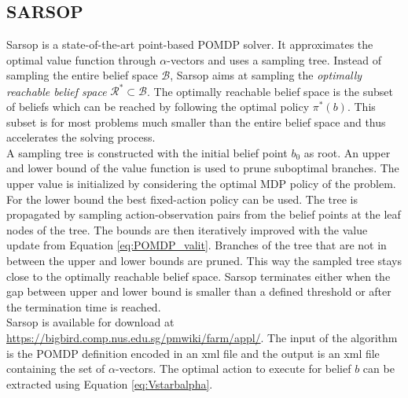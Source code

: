 \subsection{SARSOP}\label{subsec:SARSOP}
Sarsop \cite{6284837} is a state-of-the-art point-based POMDP solver. It approximates the optimal value function through $\alpha$-vectors and uses a sampling tree. 
Instead of sampling the entire belief space $\mathcal{B}$, Sarsop aims at sampling the \textit{optimally reachable belief space} $\mathcal{R}^* \subset \mathcal{B}$.
The optimally reachable belief space is the subset of beliefs which can be reached by following the optimal policy $\pi^*(b)$. This subset is for most problems much smaller than the entire belief space and thus accelerates the solving process.\\

A sampling tree is constructed with the initial belief point $b_0$ as root. An upper and lower bound of the value function is used to prune suboptimal branches. The upper value is initialized by considering the optimal MDP policy of the problem. For the lower bound the best fixed-action policy can be used. The tree is propagated by sampling action-observation pairs from the belief points at the leaf nodes of the tree. The bounds are then iteratively improved with the value update from Equation \ref{eq:POMDP_valit}. Branches of the tree that are not in between the upper and lower bounds are pruned. This way the sampled tree stays close to the optimally reachable belief space. Sarsop terminates either when the gap between upper and lower bound is smaller than a defined threshold or after the termination time is reached.\\

Sarsop is available for download at \url{https://bigbird.comp.nus.edu.sg/pmwiki/farm/appl/}. The input of the algorithm is the POMDP definition encoded in an xml file and the output is an xml file containing the set of $\alpha$-vectors. The optimal action to execute for belief $b$ can be extracted using Equation \ref{eq:Vstarbalpha}. 


